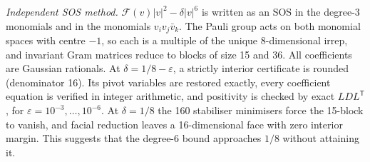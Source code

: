 \documentclass[11pt]{article}
\theoremstyle{remark}\newtheorem*{remark}{Remark}
\newcommand{\F}{\mathcal{F}}
\begin{document}
\noindent\emph{Independent SOS method.} $\F(v)|v|^2-\delta|v|^6$ is written as an SOS in the degree-3 monomials and in the monomials
$v_iv_j\bar v_k$. The Pauli group acts on both monomial spaces with centre $-1$, so each is a multiple of the unique 8-dimensional
irrep, and invariant Gram matrices reduce to blocks of size 15 and 36. All coefficients are Gaussian rationals. At
$\delta=1/8-\varepsilon$, a strictly interior certificate is rounded (denominator 16). Its pivot variables are restored exactly, every
coefficient equation is verified in integer arithmetic, and positivity is checked by exact $LDL^{\mathsf T}$, for
$\varepsilon=10^{-3},\dots,10^{-6}$. At $\delta=1/8$ the 160 stabiliser minimisers force the 15-block to vanish, and facial reduction
leaves a 16-dimensional face with zero interior margin. This suggests that the degree-6 bound approaches $1/8$ without attaining it.
\end{document}
